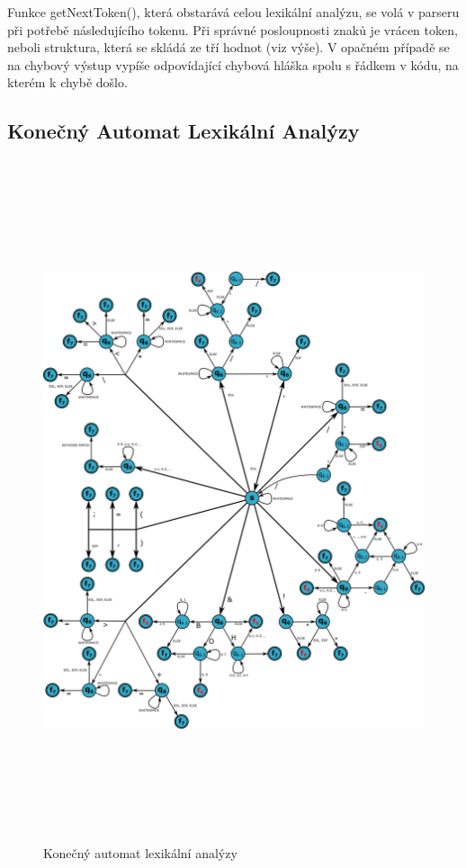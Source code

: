 \documentclass[11pt,a4paper]{article}
\begin{document}
	Funkce getNextToken(), která obstarává celou lexikální analýzu, se volá v parseru při potřebě následujícího tokenu. Při správné posloupnosti znaků je vrácen token, neboli struktura, která se skládá ze tří hodnot (viz výše). V opačném případě se na chybový výstup vypíše odpovídající chybová hláška spolu s řádkem v kódu, na kterém k chybě došlo.
    \newpage

\subsection{Konečný Automat Lexikální Analýzy}
    \vspace{1cm}

    \begin{figure}[h!]
        \centering
        \includegraphics[height=20cm]{KA.png}
        \caption{Konečný automat lexikální analýzy}
        \label{obr:LA}
    \end{figure}
\end{document}

